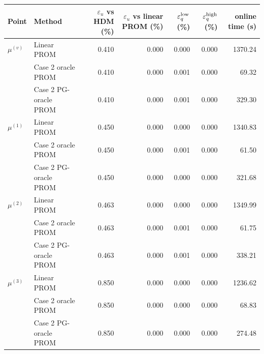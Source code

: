 \begin{tabular}{llrrrrr}
\toprule
Point & Method & $\varepsilon_u$ vs HDM (\%) & $\varepsilon_u$ vs linear PROM (\%) & $\varepsilon_q^{\rm low}$ (\%) & $\varepsilon_q^{\rm high}$ (\%) & online time (s) \\
\midrule
$\mu^{(v)}$ & Linear PROM & 0.410 & 0.000 & 0.000 & 0.000 & 1370.24 \\
 & Case 2 oracle PROM & 0.410 & 0.000 & 0.001 & 0.000 & 69.32 \\
 & Case 2 PG-oracle PROM & 0.410 & 0.000 & 0.001 & 0.000 & 329.30 \\
\midrule
$\mu^{(1)}$ & Linear PROM & 0.450 & 0.000 & 0.000 & 0.000 & 1340.83 \\
 & Case 2 oracle PROM & 0.450 & 0.000 & 0.001 & 0.000 & 61.50 \\
 & Case 2 PG-oracle PROM & 0.450 & 0.000 & 0.000 & 0.000 & 321.68 \\
\midrule
$\mu^{(2)}$ & Linear PROM & 0.463 & 0.000 & 0.000 & 0.000 & 1349.99 \\
 & Case 2 oracle PROM & 0.463 & 0.000 & 0.001 & 0.000 & 61.75 \\
 & Case 2 PG-oracle PROM & 0.463 & 0.000 & 0.001 & 0.000 & 338.21 \\
\midrule
$\mu^{(3)}$ & Linear PROM & 0.850 & 0.000 & 0.000 & 0.000 & 1236.62 \\
 & Case 2 oracle PROM & 0.850 & 0.000 & 0.000 & 0.000 & 68.83 \\
 & Case 2 PG-oracle PROM & 0.850 & 0.000 & 0.000 & 0.000 & 274.48 \\
\bottomrule
\end{tabular}
